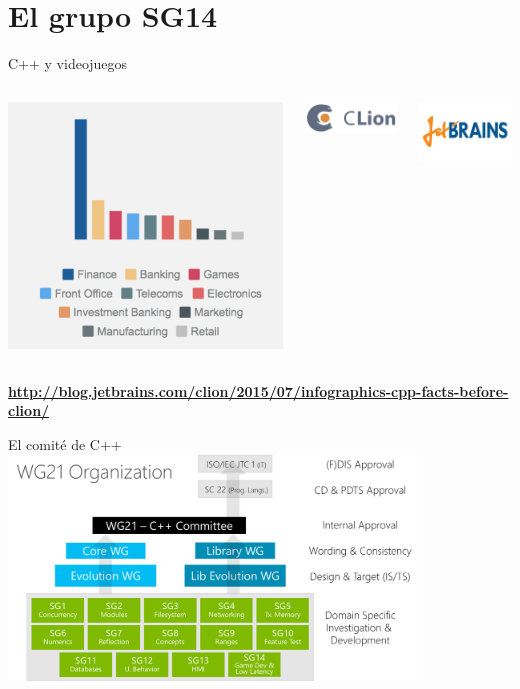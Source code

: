 \section{El grupo SG14}

\begin{frame}[t]{C++ y videojuegos}
\begin{columns}

\includegraphics[height=.7\textheight]{figs/clion-market}

\includegraphics[width=4cm]{logos/clion}

\includegraphics[width=4cm]{logos/jetbrains}

\end{columns}
\vfill
{\tiny\color{blue}\textbf{\url{http://blog.jetbrains.com/clion/2015/07/infographics-cpp-facts-before-clion/}}}
\end{frame}

\begin{frame}{El comité de C++}
\includegraphics[height=6cm]{figs/sc22-wg21}
\end{frame}

